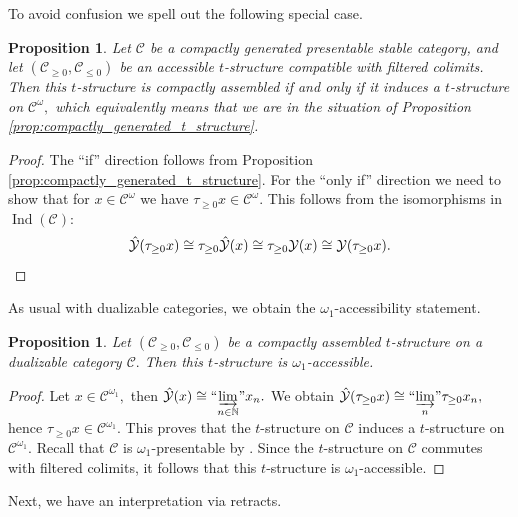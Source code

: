 \documentclass[11pt,leqno]{amsart}
\newtheorem{prop}[theo]{Proposition}
\numberwithin{equation}{section}
\def\N{\mathbb{N}}
\newcommand{\indlim}[1][]{\mathop{\varinjlim}\limits_{#1}}
\newcommand{\inddlim}[1][]{{``{\indlim[#1]}"}}
\newcommand{\cC}{{\mathcal C}}
\newcommand{\cY}{{\mathcal Y}}
\newcommand{\Ind}{\operatorname{Ind}}
\begin{document}

To avoid confusion we spell out the following special case.

\begin{prop}\label{prop:comp_ass_on_compactly_generated}
Let $\cC$ be a compactly generated presentable stable category, and let $(\cC_{\geq 0},\cC_{\leq 0})$ be an accessible $t$-structure compatible with filtered colimits. Then this $t$-structure is compactly assembled if and only if it induces a $t$-structure on $\cC^{\omega},$ which equivalently means that we are in the situation of Proposition \ref{prop:compactly_generated_t_structure}. 
\end{prop}

\begin{proof}
The ``if'' direction follows from Proposition \ref{prop:compactly_generated_t_structure}. For the ``only if'' direction we need to show that for $x\in\cC^{\omega}$ we have $\tau_{\geq 0}x\in\cC^{\omega}.$ This follows from the isomorphisms in $\Ind(\cC):$
\begin{equation*}
\hat{\cY}(\tau_{\geq 0}x)\cong \tau_{\geq 0}\hat{\cY}(x)\cong \tau_{\geq 0}\cY(x)\cong\cY(\tau_{\geq 0}x).\qedhere
\end{equation*}
\end{proof}

As usual with dualizable categories, we obtain the $\omega_1$-accessibility statement.

\begin{prop}\label{prop:comp_ass_t_structure_omega_1_accessible}
	Let $(\cC_{\geq 0},\cC_{\leq 0})$ be a compactly assembled $t$-structure on a dualizable category $\cC.$ Then this $t$-structure is $\omega_1$-accessible.
\end{prop}

\begin{proof}
	Let $x\in\cC^{\omega_1},$ then $\hat{\cY}(x)\cong\inddlim[n\in\N]x_n.$ We obtain $\hat{\cY}(\tau_{\geq 0}x)\cong \inddlim[n]\tau_{\geq 0}x_n,$ hence $\tau_{\geq 0}x\in\cC^{\omega_1}.$ This proves that the $t$-structure on $\cC$ induces a $t$-structure on $\cC^{\omega_1}.$ Recall that $\cC$ is $\omega_1$-presentable by \cite[Corollary 1.21]{E24}. Since the $t$-structure on $\cC$ commutes with filtered colimits, it follows that this $t$-structure is $\omega_1$-accessible.
\end{proof}

Next, we have an interpretation via retracts.
\end{document}
